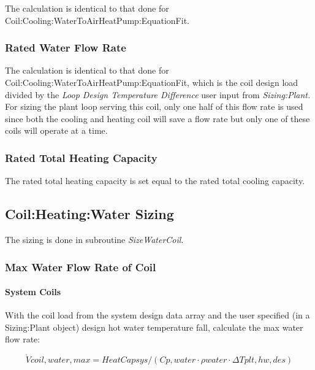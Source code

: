 The calculation is identical to that done for Coil:Cooling:WaterToAirHeatPump:EquationFit.

\subsubsection{Rated Water Flow Rate}\label{rated-water-flow-rate-3}

The calculation is identical to that done for Coil:Cooling:WaterToAirHeatPump:EquationFit, which is the coil design load divided by the \emph{Loop Design Temperature Difference} user input from \emph{Sizing:Plant.} For sizing the plant loop serving this coil, only one half of this flow rate is used since both the cooling and heating coil will save a flow rate but only one of these coils will operate at a time.

\subsubsection{Rated Total Heating Capacity}\label{rated-total-heating-capacity-1}

The rated total heating capacity is set equal to the rated total cooling capacity.

\subsection{Coil:Heating:Water Sizing}\label{coilheatingwater-sizing}

The sizing is done in subroutine \emph{SizeWaterCoil}.

\subsubsection{Max Water Flow Rate of Coil}\label{max-water-flow-rate-of-coil-1}

\paragraph{System Coils}\label{system-coils}

With the coil load from the system design data array and the user specified (in a Sizing:Plant object) design hot water temperature fall, calculate the max water flow rate:

\begin{equation}
\dot Vcoil,water,max = HeatCapsys/(Cp,water\cdot \rho water\cdot \Delta Tplt,hw,des)
\end{equation}

